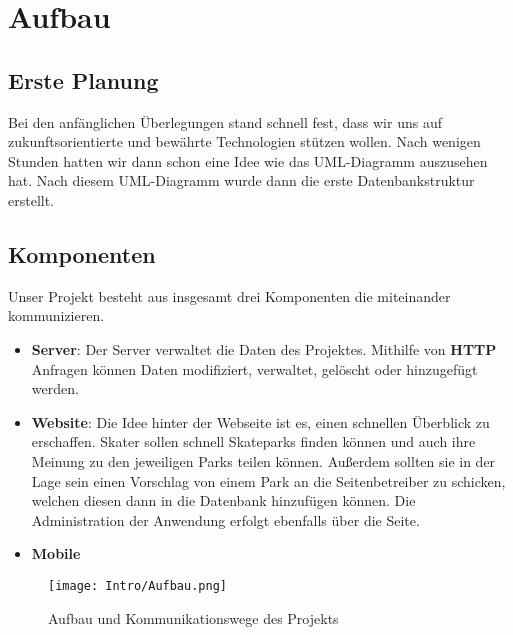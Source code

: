 \chapter{Aufbau}

\section{Erste Planung}
Bei den anfänglichen Überlegungen stand schnell fest, dass wir uns auf zukunftsorientierte und bewährte Technologien 
stützen wollen. Nach wenigen Stunden hatten wir dann schon eine Idee wie das
UML-Diagramm auszusehen hat. Nach diesem UML-Diagramm wurde dann die erste Datenbankstruktur erstellt.

\section{Komponenten}
Unser Projekt besteht aus insgesamt drei Komponenten die miteinander kommunizieren.

\begin{itemize}
    \item \textbf{Server}: Der Server verwaltet die Daten des Projektes. Mithilfe von \textbf{HTTP} Anfragen können Daten modifiziert, verwaltet, gelöscht oder hinzugefügt werden.
    \item \textbf{Website}: Die Idee hinter der Webseite ist es, einen schnellen Überblick zu erschaffen. Skater sollen schnell 
    Skateparks finden können und auch ihre Meinung zu den jeweiligen Parks teilen können. Außerdem sollten 
    sie in der Lage sein einen Vorschlag von einem Park an die Seitenbetreiber zu schicken, welchen 
    diesen dann in die Datenbank hinzufügen können. Die Administration der Anwendung erfolgt ebenfalls
    über die Seite. 
    \item \textbf{Mobile} 
\end{itemize}

\begin{figure}[H]
    \begin{center}
      \texttt{[image: Intro/Aufbau.png]}
      \caption{Aufbau und Kommunikationswege des Projekts}
    \end{center}
  \end{figure}